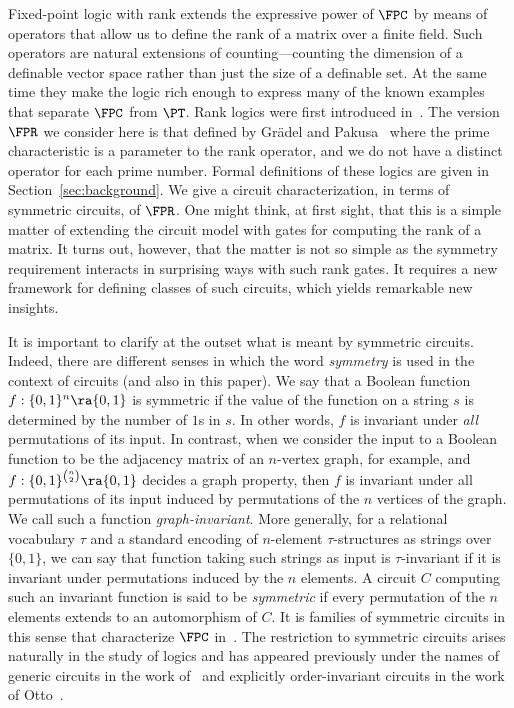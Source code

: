 \documentclass[a4paper,UKenglish]{lipics-v2018}
\begin{document}
Fixed-point logic with rank extends the expressive power of $\FPC$ by means of
operators that allow us to define the rank of a matrix over a finite field. Such
operators are natural extensions of counting---counting the dimension of a
definable vector space rather than just the size of a definable set. At the same
time they make the logic rich enough to express many of the known examples that
separate $\FPC$ from $\PT$. Rank logics were first introduced
in~\cite{Dawar09logicswith}. The version $\FPR$ we consider here is that defined
by Gr\"adel and Pakusa~\cite{GradelP15a} where the prime characteristic is a
parameter to the rank operator, and we do not have a distinct operator for each
prime number. Formal definitions of these logics are given in
Section~\ref{sec:background}. We give a circuit characterization, in terms of
symmetric circuits, of $\FPR$. One might think, at first sight, that this is a
simple matter of extending the circuit model with gates for computing the rank
of a matrix. It turns out, however, that the matter is not so simple as the
symmetry requirement interacts in surprising ways with such rank gates. It
requires a new framework for defining classes of such circuits, which yields
remarkable new insights.

It is important to clarify at the outset what is meant by symmetric circuits.
Indeed, there are different senses in which the word \emph{symmetry} is used in
the context of circuits (and also in this paper). We say that a Boolean function
$f:\{0,1\}^n \ra \{0,1\}$ is symmetric if the value of the function on a string
$s$ is determined by the number of $1$s in $s$. In other words, $f$ is invariant
under \emph{all} permutations of its input. In contrast, when we consider the
input to a Boolean function to be the adjacency matrix of an $n$-vertex graph,
for example, and $f : \{0,1\}^{n \choose 2} \ra \{0,1\}$ decides a graph
property, then $f$ is invariant under all permutations of its input induced by
permutations of the $n$ vertices of the graph. We call such a function
\emph{graph-invariant}. More generally, for a relational vocabulary $\tau$ and a
standard encoding of $n$-element $\tau$-structures as strings over $\{0,1\}$, we
can say that function taking such strings as input is $\tau$-invariant if it is
invariant under permutations induced by the $n$ elements. A circuit $C$
computing such an invariant function is said to be \emph{symmetric} if every
permutation of the $n$ elements extends to an automorphism of $C$. It is
families of symmetric circuits in this sense that characterize $\FPC$
in~\cite{AndersonD17}. The restriction to symmetric circuits arises naturally in
the study of logics and has appeared previously under the names of generic
circuits in the work of~\cite{DENENBERG1986216} and explicitly order-invariant
circuits in the work of Otto~\cite{Otto1997}.
\end{document}
